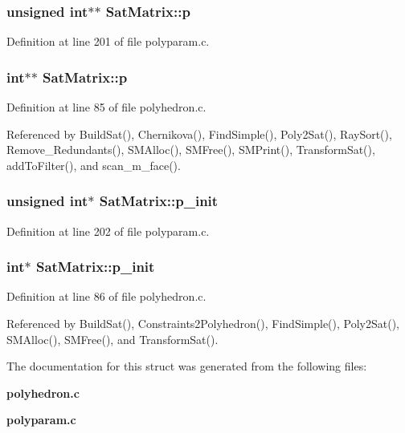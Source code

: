 \subsubsection{\setlength{\rightskip}{0pt plus 5cm}unsigned int$\ast$$\ast$ Sat\-Matrix::p}\label{structSatMatrix_m4}




Definition at line 201 of file polyparam.c.
\subsubsection{\setlength{\rightskip}{0pt plus 5cm}int$\ast$$\ast$ Sat\-Matrix::p}\label{structSatMatrix_m2}




Definition at line 85 of file polyhedron.c.

Referenced by Build\-Sat(), Chernikova(), Find\-Simple(), Poly2Sat(), Ray\-Sort(), Remove\_\-Redundants(), SMAlloc(), SMFree(), SMPrint(), Transform\-Sat(), add\-To\-Filter(), and scan\_\-m\_\-face().

\subsubsection{\setlength{\rightskip}{0pt plus 5cm}unsigned int$\ast$ Sat\-Matrix::p\_\-init}\label{structSatMatrix_m5}




Definition at line 202 of file polyparam.c.
\subsubsection{\setlength{\rightskip}{0pt plus 5cm}int$\ast$ Sat\-Matrix::p\_\-init}\label{structSatMatrix_m3}




Definition at line 86 of file polyhedron.c.

Referenced by Build\-Sat(), Constraints2Polyhedron(), Find\-Simple(), Poly2Sat(), SMAlloc(), SMFree(), and Transform\-Sat().



The documentation for this struct was generated from the following files:\begin{CompactItemize}
\item 
{\bf polyhedron.c}\item 
{\bf polyparam.c}\end{CompactItemize}
